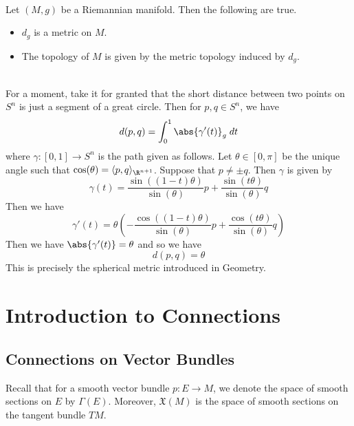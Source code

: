 \documentclass[a4paper]{article}
\begin{document}
\begin{prp}{}{}\\
Let $(M,g)$ be a Riemannian manifold. Then the following are true. 
\begin{itemize}
\item $d_g$ is a metric on $M$. 
\item The topology of $M$ is given by the metric topology induced by $d_g$. 
\end{itemize}
\end{prp}

\begin{eg}{}{}\\
For a moment, take it for granted that the short distance between two points on $S^n$ is just a segment of a great circle. Then for $p,q\in S^n$, we have $$d(p,q)=\int_0^1\abs{\gamma'(t)}_g\;dt$$ where $\gamma:[0,1]\to S^n$ is the path given as follows. Let $\theta\in[0,\pi]$ be the unique angle such that $\cos(\theta)=\langle p,q\rangle_{\R^{n+1}}$. Suppose that $p\neq\pm q$. Then $\gamma$ is given by $$\gamma(t)=\frac{\sin((1-t)\theta)}{\sin(\theta)}p+\frac{\sin(t\theta)}{\sin(\theta)}q$$ Then we have $$\gamma'(t)=\theta\left(-\frac{\cos((1-t)\theta)}{\sin(\theta)}p+\frac{\cos(t\theta)}{\sin(\theta)}q\right)$$ Then we have $\abs{\gamma'(t)}=\theta$ and so we have $$d(p,q)=\theta$$ This is precisely the spherical metric introduced in Geometry. 
\end{eg}

\pagebreak
\section{Introduction to Connections}
\subsection{Connections on Vector Bundles}
Recall that for a smooth vector bundle $p:E\to M$, we denote the space of smooth sections on $E$ by $\Gamma(E)$. Moreover, $\mathfrak{X}(M)$ is the space of smooth sections on the tangent bundle $TM$. 
\end{document}
